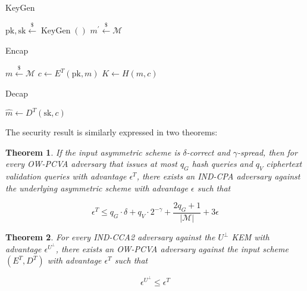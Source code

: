 \documentclass{article}
\newcommand{\norm}[1]{\vert {#1} \vert}
\newcommand{\leftsample}{\overset{{\scriptscriptstyle\$}}{\leftarrow}}
\newtheorem{theorem}{Theorem}[section]
\begin{document}
\begin{multicols}{3}
    \begin{algorithm}[H]
        \SetAlgoLined
        \caption{KeyGen}
        $\text{pk}, \text{sk} \leftsample \operatorname{KeyGen}()$\;
        $m^\prime \leftsample \mathcal{M}$\;
        \;
    \end{algorithm}
    \columnbreak

    \begin{algorithm}[H]
        \SetAlgoLined
        \caption{Encap}
        $m \leftsample \mathcal{M}$\;
        $c \leftarrow E^T(\text{pk}, m)$\;
        $K \leftarrow H(m, c)$\;
    \end{algorithm}
    \columnbreak

    \begin{algorithm}[H]
        \SetAlgoLined
        \caption{Decap}
        $\hat{m} \leftarrow D^T(\text{sk}, c)$\;
    \end{algorithm}
\end{multicols}

The security result is similarly expressed in two theorems:

\begin{theorem}\label{ow-pcva-result}
    If the input asymmetric scheme is $\delta$-correct and $\gamma$-spread, then for every OW-PCVA adversary that issues at most $q_G$ hash queries and $q_V$ ciphertext validation queries with advantage $\epsilon^T$, there exists an IND-CPA adversary against the underlying asymmetric scheme with advantage $\epsilon$ such that

    \begin{equation*}
        \epsilon^T \leq q_G \cdot \delta + q_V \cdot 2^{-\gamma} 
            + \frac{2q_G + 1}{\norm{\mathcal{M}}}
            + 3\epsilon
    \end{equation*}
\end{theorem}

\begin{theorem}\label{cca-kem-result}
    For every IND-CCA2 adversary against the $U^\bot$ KEM with advantage $\epsilon^{U^\bot}$, there exists an OW-PCVA adversary against the input scheme $(E^T, D^T)$ with advantage $\epsilon^T$ such that

    \begin{equation*}
        \epsilon^{U^\bot} \leq \epsilon^T
    \end{equation*}
\end{theorem}
\end{document}
